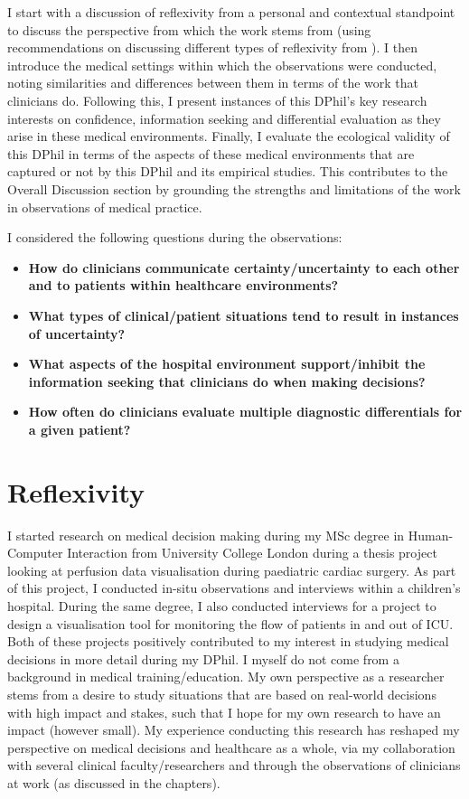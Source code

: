 \documentclass[a4paper, nobind]{templates/ociamthesis}
\providecommand{\tightlist}{%
  \setlength{\itemsep}{0pt}\setlength{\parskip}{0pt}}
\begin{document}
\hfill\break
I start with a discussion of reflexivity from a personal and contextual standpoint to discuss the perspective from which the work stems from (using recommendations on discussing different types of reflexivity from \autocite{olmos-vega_practical_2023}). I then introduce the medical settings within which the observations were conducted, noting similarities and differences between them in terms of the work that clinicians do. Following this, I present instances of this DPhil's key research interests on confidence, information seeking and differential evaluation as they arise in these medical environments. Finally, I evaluate the ecological validity of this DPhil in terms of the aspects of these medical environments that are captured or not by this DPhil and its empirical studies. This contributes to the Overall Discussion section by grounding the strengths and limitations of the work in observations of medical practice.

\hfill\break
I considered the following questions during the observations:

\begin{itemize}
\tightlist
\item
  \textbf{How do clinicians communicate certainty/uncertainty to each other and to patients within healthcare environments?}
\item
  \textbf{What types of clinical/patient situations tend to result in instances of uncertainty?}
\item
  \textbf{What aspects of the hospital environment support/inhibit the information seeking that clinicians do when making decisions?}
\item
  \textbf{How often do clinicians evaluate multiple diagnostic differentials for a given patient?}
\end{itemize}

\section{Reflexivity}\label{reflexivity}

I started research on medical decision making during my MSc degree in Human-Computer Interaction from University College London during a thesis project looking at perfusion data visualisation during paediatric cardiac surgery. As part of this project, I conducted in-situ observations and interviews within a children's hospital. During the same degree, I also conducted interviews for a project to design a visualisation tool for monitoring the flow of patients in and out of ICU. Both of these projects positively contributed to my interest in studying medical decisions in more detail during my DPhil. I myself do not come from a background in medical training/education. My own perspective as a researcher stems from a desire to study situations that are based on real-world decisions with high impact and stakes, such that I hope for my own research to have an impact (however small). My experience conducting this research has reshaped my perspective on medical decisions and healthcare as a whole, via my collaboration with several clinical faculty/researchers and through the observations of clinicians at work (as discussed in the chapters).
\end{document}
